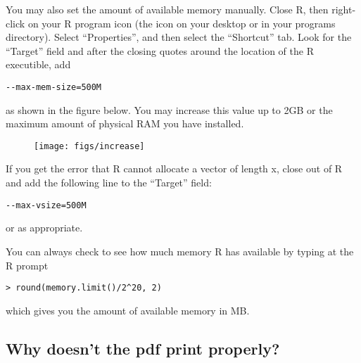 You may also set the amount of available memory manually.  Close R,
then right-click on your R program icon (the icon on your desktop or
in your programs directory). Select ``Properties'', and then select
the ``Shortcut'' tab.  Look for the ``Target'' field and after the
closing quotes around the location of the R executible, add
\begin{verbatim}
--max-mem-size=500M
\end{verbatim}
as shown in the figure below.  You may increase this value up to 2GB
or the maximum amount of physical RAM you have installed.

\begin{figure}[h!]
\begin{center}
\texttt{[image: figs/increase]}
\end{center}
\end{figure}

If you get the error that R cannot allocate a vector of length x,
close out of R and add the following line to the ``Target'' field:  
\begin{verbatim}
--max-vsize=500M
\end{verbatim}
or as appropriate.  

You can always check to see how much memory R has available by typing
at the R prompt
\begin{verbatim}
> round(memory.limit()/2^20, 2)
\end{verbatim}
which gives you the amount of available memory in MB.  




\subsection*{Why doesn't the pdf print properly?} 

